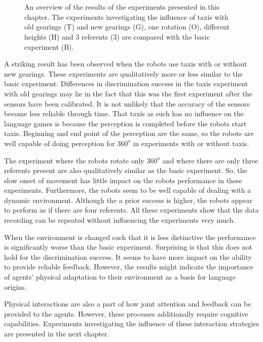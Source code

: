 \begin{figure}
\\
\\
\caption{An overview of the results of the experiments presented in this chapter. The experiments investigating the influence of taxis with old gearings (T) and new gearings (G), one rotation (O), different heights (H) and 3 referents (3) are compared with the basic experiment (B).}
\label{f:int:results}
\end{figure}

\p
A striking result has been observed when the robots use taxis with or without new gearings. These experiments are qualitatively more or less similar to the basic experiment. Differences in discrimination success in the taxis experiment with old gearings may lie in the fact that this was the first experiment after the sensors have been calibrated. It is not unlikely that the accuracy of the sensors become less reliable through time. That taxis as such has no influence on the language games is because the perception is completed before the robots start taxis. Beginning and end point of the perception are the same, so the robots are well capable of doing perception for $360^o$ in experiments with or without taxis.

The experiment where the robots rotate only $360^o$ and where there are only three referents present are also qualitatively similar as the basic experiment. So, the slow onset of movement has little impact on the robots performance in these experiments. Furthermore, the robots seem to be well capable of dealing with a dynamic environment. Although the a prior success is higher, the robots appear to perform as if there are four referents. All these experiments show that the data recording can be repeated without influencing the experiments very much.

When the environment is changed such that it is less distinctive the performance is significantly worse than the basic experiment. Surprising is that this does not hold for the discrimination success. It seems to have more impact on the ability to provide reliable feedback. However, the results might indicate the importance of agents' physical adaptation to their environment as a basis for language origins.

\p
Physical interactions are also a part of how joint attention and feedback can be provided to the agents. However, these processes additionally require cognitive capabilities. Experiments investigating the influence of these interaction strategies are presented in the next chapter.
